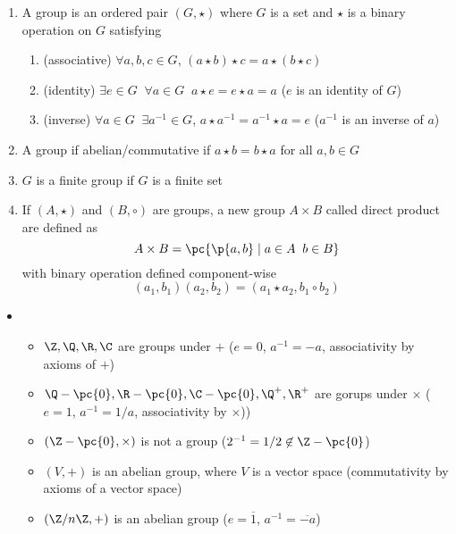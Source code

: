 \documentclass[11pt]{article}
\begin{document}
\begin{definition*}
    \begin{enumerate}
        \item {} A group is an ordered pair $(G,\star)$ where $G$ is a set and $\star$ is a binary operation on $G$ satisfying 
        \begin{enumerate}
            \item (associative) $\forall a,b,c\in G$, $(a\star b) \star c = a\star (b \star c)$
            \item (identity) $\exists e\in G \;\; \forall a\in G \;\;  a\star e = e \star a = a$ ($e$ is an identity of $G$)
            \item (inverse) $\forall a\in G \;\; \exists a^{-1}\in G$, $a\star a^{-1}  = a^{-1} \star a = e$ ($a^{-1}$ is an inverse of $a$)
        \end{enumerate}
        \item {} A group if abelian/commutative if $a\star b = b\star a$ for all $a,b\in G$ 
        \item {} $G$ is a finite group if $G$ is a finite set
        \item {} If $(A, \star)$ and $(B, \circ)$ are groups, a new group $A\times B$ called direct product are defined as 
        \[
            A\times B = \pc{\p{a,b} \mid a\in A \;\; b\in B}
        \]
        with binary operation defined component-wise 
        \[
            (a_1, b_1)(a_2, b_2) = (a_1 \star a_2, b_1 \circ b_2)    
        \]
    \end{enumerate}
    \begin{itemize}
        \item {}
        \begin{itemize}
            \item $\Z,\Q,\R,\C$ are groups under $+$ ($e=0$, $a^{-1} = -a$, associativity by axioms of $+$)
            \item $\Q - \pc{0}, \R-\pc{0}, \C-\pc{0}, \Q^+, \R^+$ are gorups under $\times$ ($e = 1$, $a^{-1} = 1/a$, associativity by $\times$))
            \item $(\Z - \pc{0}, \times )$ is not a group ($2^{-1} = 1/2\not\in \Z - \pc{0}$)
            \item $(V,+)$ is an abelian group, where $V$ is a vector space (commutativity by axioms of a vector space)
            \item $(\integermodn, +)$ is an abelian group ($e = \overline{1}$, $a^{-1} = \overline{-a}$)

\end{itemize}
\end{itemize}
\end{definition*}
\end{document}
